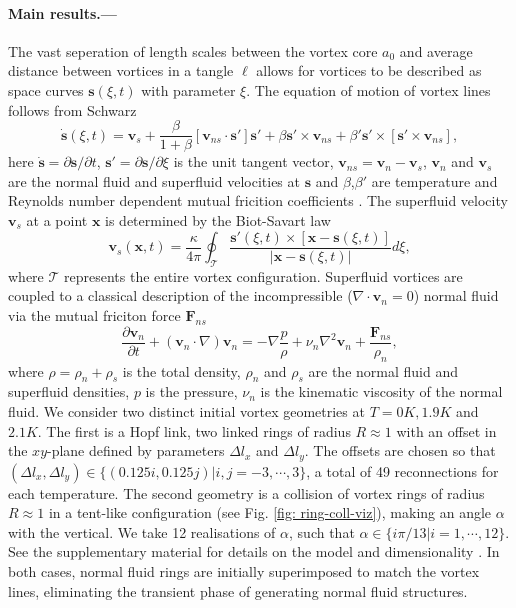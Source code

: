 \documentclass[%
 reprint,
 amsmath,amssymb,
 aps,
 prl,
]{revtex4-2}
\def \s{\mathbf{s}}
\def \v{\mathbf{v}}
\def \x{\mathbf{x}}
\begin{document}
\paragraph*{Main results.---}The vast seperation of length scales between the vortex core $a_0$ and average distance between vortices in a tangle $\ell$ allows for vortices to be described as space curves $\s(\xi,t)$ with parameter $\xi$. The equation of motion of vortex lines follows from Schwarz \cite{schwarzThreedimensionalVortexDynamics1988a}
\begin{equation}
	\dot{\s}(\xi,t) = \v_s + \frac{\beta}{1+\beta}\left[\v_{ns}\cdot \s'\right]\s' + \beta\s'\times\v_{ns}+\beta'\s'\times\left[\s'\times \v_{ns}\right],
\end{equation}
here $\dot{\s}=\partial\s/\partial t$, $\s'=\partial\s/\partial \xi$ is the unit tangent vector, $\v_{ns}=\v_n - \v_s$, $\v_n$ and $\v_s$ are the normal fluid and superfluid velocities at $\s$ and $\beta$,$\beta'$ are temperature and Reynolds number dependent mutual fricition coefficients \cite{galantucciNewSelfconsistentApproach2020b}. The superfluid velocity $\v_s$ at a point $\x$ is determined by the Biot-Savart law
\begin{equation}
	\v_s(\x,t) = \frac{\kappa}{4\pi}\oint_{\mathcal{T}}\frac{\s'(\xi,t)\times\left[\x-\s(\xi,t)\right]}{|\x-\s(\xi,t)|}d\xi,
\end{equation}
where $\mathcal{T}$ represents the entire vortex configuration. Superfluid vortices are coupled to a classical description of the incompressible ($\nabla\cdot\v_n=0$) normal fluid via the mutual friciton force $\mathbf{F}_{ns}$
\begin{equation}
	\frac{\partial \v_n}{\partial t} + (\v_n\cdot\nabla)\v_n = -\nabla\frac{p}{\rho} + \nu_n\nabla^2\v_n + \frac{\mathbf{F}_{ns}}{\rho_n},
\end{equation}
where $\rho=\rho_n + \rho_s$ is the total density, $\rho_n$ and $\rho_s$ are the normal fluid and superfluid densities, $p$ is the pressure, $\nu_n$ is the kinematic viscosity of the normal fluid. We consider two distinct initial vortex geometries at $T=0K,1.9K$ and $2.1K$. The first is a Hopf link, two linked rings of radius $R\approx1$ with an offset in the $xy$-plane defined by parameters $\Delta l_x$ and $\Delta l_y$. The offsets are chosen so that $(\Delta l_x, \Delta l _y) \in \lbrace(0.125i,0.125j)|i,j=-3,\cdots,3 \rbrace$, a total of 49 reconnections for each temperature. The second geometry is a collision of vortex rings of radius $R\approx1$ in a tent-like configuration (see Fig. \ref{fig: ring-coll-viz}), making an angle $\alpha$ with the vertical. We take 12 realisations of $\alpha$, such that $\alpha\in\lbrace i\pi/13|i=1,\cdots,12\rbrace$. See the supplementary material for details on the model and dimensionality \cite{SeeSupplementaryMaterials}. In both cases, normal fluid rings are initially superimposed to match the vortex lines, eliminating the transient phase of generating normal fluid structures.
\end{document}
